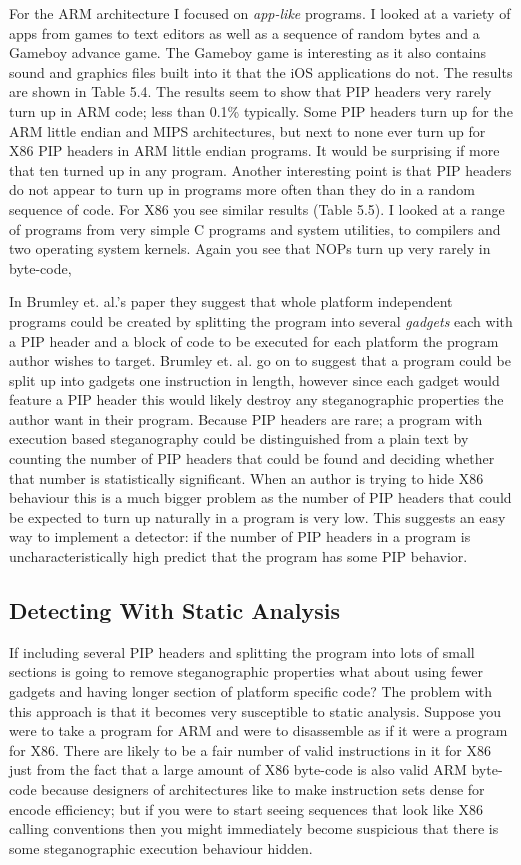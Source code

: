 \documentclass[10pt]{book}
\begin{document}
For the ARM architecture I focused on \emph{app-like} programs. I looked
at a variety of apps from games to text editors as well as a sequence of
random bytes and a Gameboy advance game. The Gameboy game is interesting
as it also contains sound and graphics files built into it that the iOS
applications do not. The results are shown in Table 5.4. The results
seem to show that PIP headers very rarely turn up in ARM code; less than
0.1\% typically. Some PIP headers turn up for the ARM little endian and
MIPS architectures, but next to none ever turn up for X86 PIP headers in
ARM little endian programs. It would be surprising if more that ten
turned up in any program. Another interesting point is that PIP headers
do not appear to turn up in programs more often than they do in a random
sequence of code. For X86 you see similar results (Table 5.5). I looked
at a range of programs from very simple C programs and system utilities,
to compilers and two operating system kernels. Again you see that NOPs
turn up very rarely in byte-code,

In Brumley et. al.'s paper\autocite{Cha:2010uh} they suggest that whole
platform independent programs could be created by splitting the program
into several \emph{gadgets} each with a PIP header and a block of code
to be executed for each platform the program author wishes to target.
Brumley et. al. go on to suggest that a program could be split up into
gadgets one instruction in length, however since each gadget would
feature a PIP header this would likely destroy any steganographic
properties the author want in their program. Because PIP headers are
rare; a program with execution based steganography could be
distinguished from a plain text by counting the number of PIP headers
that could be found and deciding whether that number is statistically
significant. When an author is trying to hide X86 behaviour this is a
much bigger problem as the number of PIP headers that could be expected
to turn up naturally in a program is very low. This suggests an easy way
to implement a detector: if the number of PIP headers in a program is
uncharacteristically high predict that the program has some PIP
behavior.

\subsection{Detecting With Static Analysis}

If including several PIP headers and splitting the program into lots of
small sections is going to remove steganographic properties what about
using fewer gadgets and having longer section of platform specific code?
The problem with this approach is that it becomes very susceptible to
static analysis. Suppose you were to take a program for ARM and were to
disassemble as if it were a program for X86. There are likely to be a
fair number of valid instructions in it for X86 just from the fact that
a large amount of X86 byte-code is also valid ARM byte-code because
designers of architectures like to make instruction sets dense for
encode efficiency; but if you were to start seeing sequences that look
like X86 calling conventions then you might immediately become
suspicious that there is some steganographic execution behaviour hidden.
\end{document}
